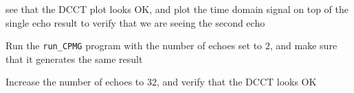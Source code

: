 see that the DCCT plot looks OK,
and plot the time domain signal on top of the single echo result to verify that we are seeing the second echo

Run the \texttt{run_CPMG} program with the number of echoes set to 2, and make sure that it generates the same result

Increase the number of echoes to 32, and verify that the DCCT looks OK


